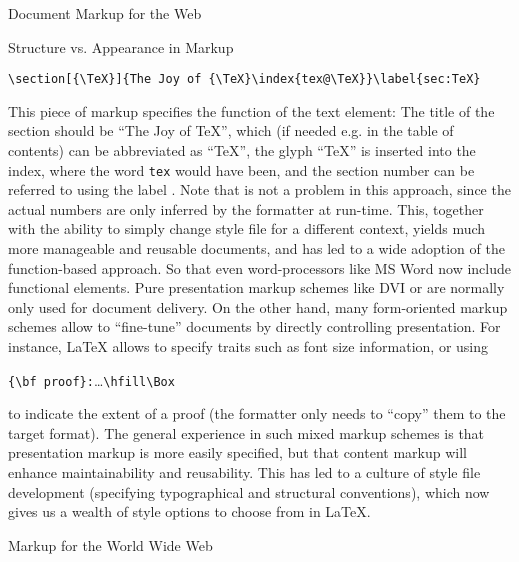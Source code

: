 \begin{omgroup}[id=markup-web]{Document Markup for the Web}
\begin{omgroup}[id=markup-types]{Structure vs. Appearance in Markup}
\begin{small}
\begin{verbatim}
\section[{\TeX}]{The Joy of {\TeX}\index{tex@\TeX}}\label{sec:TeX}
\end{verbatim}
\end{small}
This piece of markup specifies the function of the text element: The title of the section
should be ``The Joy of {\TeX}'', which (if needed e.g. in the table of contents) can be
abbreviated as ``{\TeX}'', the glyph ``{\TeX}'' is inserted into the index, where the word
{\tt{tex}} would have been, and the section number can be referred to using the label
{}.  Note that {} is not a problem in this
approach, since the actual numbers are only inferred by the formatter at run-time. This,
together with the ability to simply change style file for a different context, yields much
more manageable and reusable documents, and has led to a wide adoption of the
function-based approach. So that even word-processors like MS Word now include functional
elements. Pure presentation markup schemes like {DVI} or {\postscript} are
normally only used for document delivery. On the other hand, many form-oriented markup
schemes allow to ``fine-tune'' documents by directly controlling presentation. For
instance, {\LaTeX} allows to specify traits such as font size information, or using
\begin{center}
  {\verb+{\bf proof}:+}\ldots{\verb+\hfill\Box+}
\end{center}
to indicate the extent of a proof (the formatter only needs to ``copy'' them to
the target format). The general experience in such mixed markup schemes is that
presentation markup is more easily specified, but that content markup will enhance
maintainability and reusability. This has led to a culture of style file
development (specifying typographical and structural conventions), which now gives
us a wealth of style options to choose from in {\LaTeX}.
\end{omgroup}

\begin{omgroup}[id=markup:www]{Markup for the World Wide Web}


\end{omgroup}
\end{omgroup}

